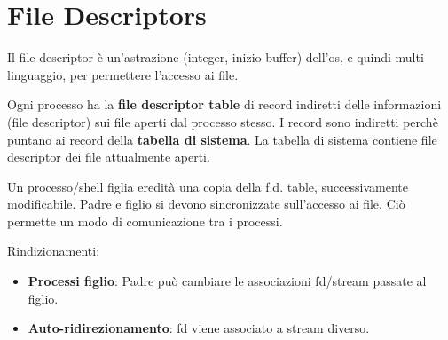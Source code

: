 \section{File Descriptors}
Il file descriptor è un'astrazione (integer, inizio buffer) dell'os, e quindi multi linguaggio, per permettere l'accesso ai file.

Ogni processo ha la \textbf{file descriptor table} di record indiretti delle informazioni (file descriptor) sui file aperti dal processo stesso.
I record sono indiretti perchè puntano ai record della \textbf{tabella di sistema}. La tabella di sistema contiene file descriptor dei file attualmente aperti.

Un processo/shell figlia eredità una copia della f.d. table, successivamente modificabile. Padre e figlio si devono sincronizzate sull'accesso ai file. Ciò permette un modo di comunicazione tra i processi.

Rindizionamenti:
\begin{itemize}
	\item \textbf{Processi figlio}: Padre può cambiare le associazioni fd/stream passate al figlio.
	\item \textbf{Auto-ridirezionamento}: fd viene associato a stream diverso.
\end{itemize}

